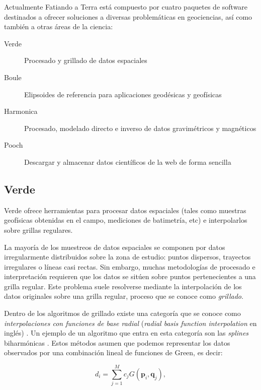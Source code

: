 Actualmente Fatiando a Terra está compuesto por cuatro paquetes de software
destinados a ofrecer soluciones a diversas problemáticas en geociencias, así
como también a otras áreas de la ciencia:

\begin{description}
    \item[Verde]{%
        Procesado y grillado de datos espaciales
    }
    \item[Boule]{%
        Elipsoides de referencia para aplicaciones geodésicas y geofísicas
    }
    \item[Harmonica]{%
        Procesado, modelado directo e inverso de datos gravimétricos
        y magnéticos
    }
    \item[Pooch]{%
        Descargar y almacenar datos científicos de la web de forma sencilla
    }
\end{description}

\subsection{Verde}

Verde ofrece herramientas para procesar datos espaciales (tales como
muestras geofísicas obtenidas en el campo, mediciones de batimetría, etc)
e interpolarlos sobre grillas regulares.

La mayoría de los muestreos de datos espaciales se componen por datos
irregularmente distribuidos sobre la zona de estudio:
puntos dispersos, trayectos irregulares o líneas casi rectas.
Sin embargo, muchas metodologías de procesado e interpretación requieren que
los datos se sitúen sobre puntos pertenecientes a una grilla regular.
Este problema suele resolverse mediante la interpolación de los datos
originales sobre una grilla regular, proceso que se conoce como
\emph{grillado}.

Dentro de los algoritmos de grillado existe una categoría que se conoce como
\emph{interpolaciones con funciones de base radial} (\emph{radial basis
function interpolation} en inglés) \citep{franke1982}.
Un ejemplo de un algoritmo que entra en esta categoría son las \emph{splines}
biharmónicas \citep{sandwell1987}.
Estos métodos asumen que podemos representar los datos observados por una
combinación lineal de funciones de Green, es decir:

\begin{equation}
    d_i = \sum_{j=1}^M c_j G(\mathbf{p}_i, \mathbf{q}_j),
\end{equation}

